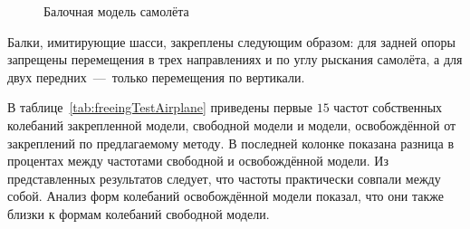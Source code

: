 \begin{figure}[!htb]
    \centerfloat
    \caption{Балочная модель самолёта} \label{fig:freeingAircraft}
\end{figure}

Балки, имитирующие шасси, закреплены следующим образом: для задней опоры запрещены перемещения в трех направлениях и по углу рыскания самолёта, а для двух передних~---~только перемещения по вертикали.

В таблице~\ref{tab:freeingTestAirplane} приведены первые $ 15 $ частот собственных колебаний закрепленной модели, свободной модели и модели, освобождённой от закреплений по предлагаемому методу. В последней колонке показана разница в процентах между частотами свободной и освобождённой модели. Из представленных результатов следует, что частоты практически совпали между собой. Анализ форм колебаний освобождённой модели показал, что они также близки к формам колебаний свободной модели.

